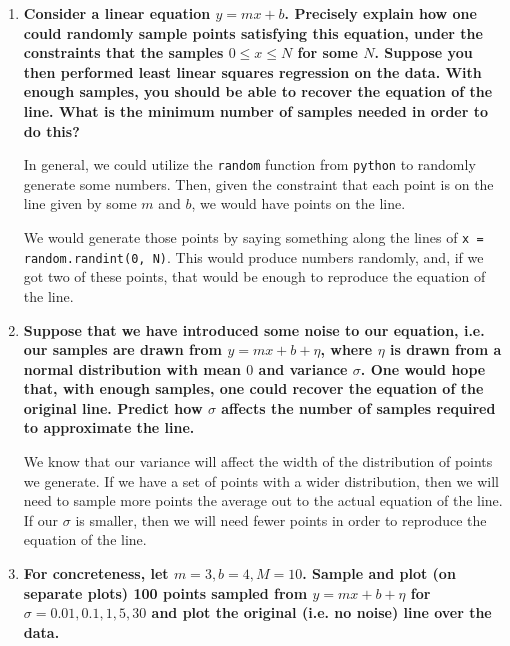 \documentclass[11pt]{article}
\begin{document}
    \begin{enumerate}
        \item \textbf{Consider a linear equation $y = mx + b$. Precisely explain 
            how one could randomly sample points satisfying this equation, under 
            the constraints that the samples $0 \leq x \leq N$ for some $N$. Suppose you then 
            performed least linear squares regression on the data. With enough 
            samples, you should be able to recover the equation of the line. What 
            is the minimum number of samples needed in order to do this?}

            In general, we could utilize the \texttt{random} function from
            \texttt{python} to randomly generate some numbers. Then, given the
            constraint that each point is on the line given by some $m$ and
            $b$, we would have points on the line.

            We would generate those points by saying something along the lines
            of \texttt{x = random.randint(0, N)}. This would produce numbers
            randomly, and, if we got two of these points, that would be enough
            to reproduce the equation of the line.
        \item \textbf{Suppose that we have introduced some noise to our equation, 
            i.e. our samples are drawn from $y = mx+ b+ \eta$, where $\eta$ is drawn 
            from a normal distribution with mean $0$ and variance $\sigma$. One would
            hope that, with enough samples, one could recover the equation of 
            the original line. Predict how $\sigma$ affects the number of samples 
            required to approximate the line.}

            We know that our variance will affect the width of the distribution
            of points we generate. If we have a set of points with a wider
            distribution, then we will need to sample more points the average
            out to the actual equation of the line. If our $\sigma$ is smaller,
            then we will need fewer points in order to reproduce the equation
            of the line.

        \item \textbf{For concreteness, let $m = 3,b = 4,M = 10$. Sample and plot 
            (on separate plots) 100 points sampled from $y = mx + b + \eta$ for 
            $\sigma = 0.01,0.1,1,5,30$ and plot the original (i.e. no noise) 
            line over the data.} 


\end{enumerate}
\end{document}
